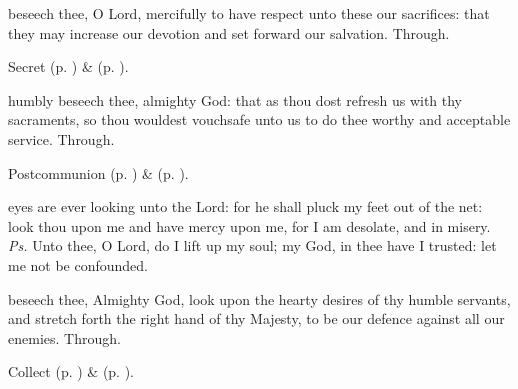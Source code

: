 
\secret
{} beseech thee, O Lord, mercifully to have respect unto these our sacrifices: that they may increase our devotion and set forward our salvation. Through.

\begin{rubric}
     Secret  (p. \pageref{AshWednesdayMassSecret}) \&   (p. \pageref{SPLivingDeparted}).
\end{rubric}


\postcommunion
{} humbly beseech thee, almighty God: that as thou dost refresh us with thy sacraments, so thou wouldest vouchsafe unto us to do thee worthy and acceptable service. Through.

\begin{rubric}
     Postcommunion  (p. \pageref{AshWednesdayMassPostcommunion}) \&   (p. \pageref{SPLivingDeparted}).
\end{rubric}


\clearpage
{}


\introit
{} eyes are ever looking unto the Lord: for he shall pluck my feet out of the net: look thou upon me and have mercy upon me, for I am desolate, and in misery. \textit{Ps.} Unto thee, O Lord, do I lift up my soul; my God, in thee have I trusted: let me not be confounded.

\collect
{} beseech thee, Almighty God, look upon the hearty desires of thy humble servants, and stretch forth the right hand of thy Majesty, to be our defence against all our enemies. Through.

\begin{rubric}
     Collect  (p. \pageref{AshWednesdayMassCollect}) \&   (p. \pageref{SPLivingDeparted}).
\end{rubric}

